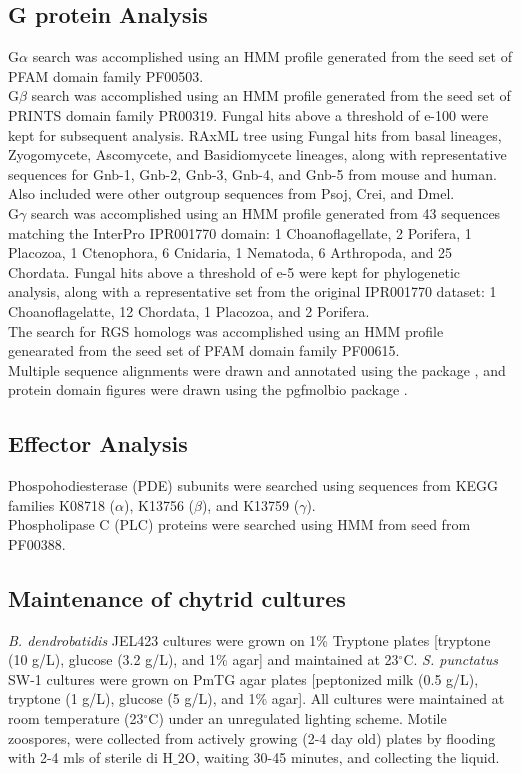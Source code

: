\subsection*{G protein Analysis}
\indent G$\alpha$ search was accomplished using an HMM profile generated from the seed set of PFAM domain family PF00503.\\
\indent G$\beta$ search was accomplished using an HMM profile generated from the seed set of PRINTS domain family PR00319. Fungal hits above a threshold of e-100 were kept for subsequent analysis. RAxML tree using Fungal hits from basal lineages, Zyogomycete, Ascomycete, and Basidiomycete lineages, along with representative sequences for Gnb-1, Gnb-2, Gnb-3, Gnb-4, and Gnb-5 from mouse and human. Also included were other outgroup sequences from Psoj, Crei, and Dmel.\\
\indent G$\gamma$ search was accomplished using an HMM profile generated from 43 sequences matching the InterPro IPR001770 domain: 1 Choanoflagellate, 2 Porifera, 1 Placozoa, 1 Ctenophora, 6 Cnidaria, 1 Nematoda, 6 Arthropoda, and 25 Chordata. Fungal hits above a threshold of e-5 were kept for phylogenetic analysis, along with a representative set from the original IPR001770 dataset: 1 Choanoflagelatte, 12 Chordata, 1 Placozoa, and 2 Porifera. \\
\indent The search for RGS homologs was accomplished using an HMM profile genearated from the seed set of PFAM domain family PF00615.\\
\indent Multiple sequence alignments were drawn and annotated using the \TeXshade package \cite{Beitz2000texshade}, and protein domain figures were drawn using the pgfmolbio package \cite{}.\\

\subsection*{Effector Analysis}
\indent Phospohodiesterase (PDE) subunits were searched using sequences from KEGG families K08718 ($\alpha$), K13756 ($\beta$), and K13759 ($\gamma$). \\
\indent Phospholipase C (PLC) proteins were searched using HMM from seed from PF00388.\\

\subsection*{Maintenance of chytrid cultures}
\textit{B. dendrobatidis} JEL423 cultures were grown on 1\% Tryptone plates [tryptone (10 g/L), glucose (3.2 g/L), and 1\% agar] and maintained at 23$^{\circ}$C. \textit{S. punctatus} SW-1 cultures were grown on PmTG agar plates [peptonized milk (0.5 g/L), tryptone (1 g/L), glucose (5 g/L), and 1\% agar]. All cultures were maintained at room temperature (23$^{\circ}$C) under an unregulated lighting scheme. Motile zoospores, were collected from actively growing (2-4 day old) plates by flooding with 2-4 mls of sterile di H$\_{2}$O, waiting 30-45 minutes, and collecting the liquid. \\
